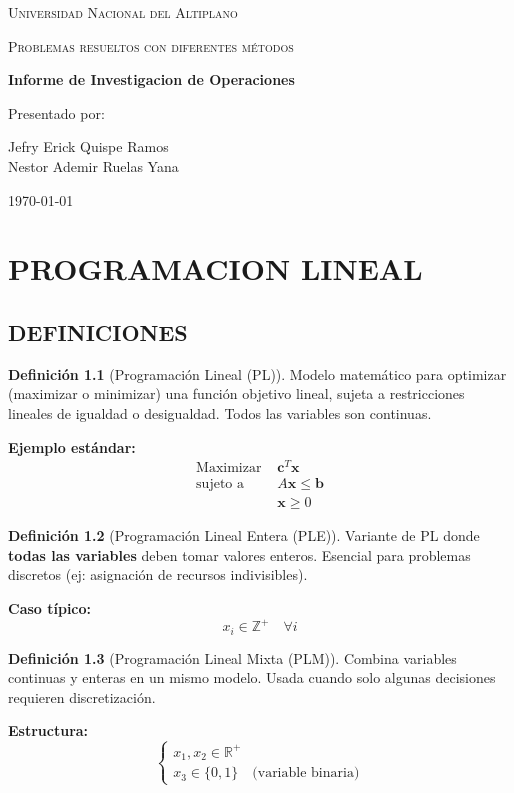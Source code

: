 \documentclass[12pt, a4paper, oneside]{book}
\theoremstyle{definition}
\newtheorem{definicion}{Definición}[chapter]
\newcommand{\portada}{
  \begin{titlepage}
    \centering
    {\scshape\LARGE Universidad Nacional del Altiplano\par}
    \vspace{1.5cm}
    {\scshape\Large Problemas resueltos con diferentes métodos\par}
    \vspace{1.5cm}
    {\huge\bfseries Informe de Investigacion de Operaciones\par}
    \vspace{2cm}
    {\Large Presentado por:\par}
    \vspace{0.5cm}
    {\Large Jefry Erick Quispe Ramos\\
    Nestor Ademir Ruelas Yana}
    \vfill
    {\large \today\par}
  \end{titlepage}
}
\begin{document}
\portada
\tableofcontents
\newpage


\chapter{PROGRAMACION LINEAL}

\section{DEFINICIONES}

\begin{definicion}[Programación Lineal (PL)]
Modelo matemático para optimizar (maximizar o minimizar) una función objetivo lineal, sujeta a restricciones lineales de igualdad o desigualdad. Todos las variables son continuas.

\textbf{Ejemplo estándar:}
\begin{align*}
\text{Maximizar } & \mathbf{c}^T\mathbf{x} \\
\text{sujeto a } & A\mathbf{x} \leq \mathbf{b} \\
& \mathbf{x} \geq 0
\end{align*}
\end{definicion}

\begin{definicion}[Programación Lineal Entera (PLE)]
Variante de PL donde \textbf{todas las variables} deben tomar valores enteros. Esencial para problemas discretos (ej: asignación de recursos indivisibles).

\textbf{Caso típico:}
\begin{equation*}
x_i \in \mathbb{Z}^+ \quad \forall i
\end{equation*}
\end{definicion}

\begin{definicion}[Programación Lineal Mixta (PLM)]
Combina variables continuas y enteras en un mismo modelo. Usada cuando solo algunas decisiones requieren discretización.

\textbf{Estructura:}
\begin{equation*}
\begin{cases}
x_1, x_2 \in \mathbb{R}^+ \\
x_3 \in \{0,1\} \quad \text{(variable binaria)}
\end{cases}
\end{equation*}
\end{definicion}
\end{document}
